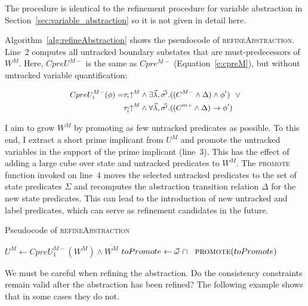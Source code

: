 The procedure is identical to the refinement procedure for variable abstraction in Section~\ref{sec:variable_abstraction} so it is not given in detail here.

Algorithm~\ref{alg:refineAbstraction} shows the pseudocode of \textsc{refineAbstraction}.  Line~2 computes all untracked boundary substates that are must-predecessors of $W^M$.  Here, $CpreU^{M-}$ is the same as $Cpre^{M-}$ (Equation~\ref{e:cpreM}), but without untracked variable quantification:

$$
    \small
\begin{aligned}
    CpreU_i^{M-}(\phi) = &\tau_i\mathord{\uparrow^M}         \land \exists \vec{\lambda},\vec{\sigma'}. ((C^{M-} \land \Delta) \land \phi')
                          ~~\lor\\
                         &\tau_{\overline{i}}\mathord{\uparrow^M} \land \forall \vec{\lambda},\vec{\sigma'}. ((C^{m+} \land \Delta) \rightarrow \phi')
\end{aligned}
$$

I aim to grow  $W^M$ by promoting as few untracked predicates as possible.  To this end, I extract a short prime implicant from $U^M$ and promote the untracked variables in the support of the prime implicant (line~3).  This has the effect of adding a large cube over state and untracked predicates to $W^M$. The \textsc{promote} function invoked on line~4 moves the selected untracked predicates to the set of state predicates $\Sigma$ and recomputes the abstraction transition relation $\Delta$ for the new state predicates.  This can lead to the introduction of new untracked and label predicates, which can serve as refinement candidates in the future.

\begin{algorithm}[t]

\caption{Pseudocode of \textsc{refineAbstraction}}
\label{alg:refineAbstraction}

\begin{algorithmic}[1]

    \State $U^M \gets CpreU_1^{M-}(W^M) \land \overline{W^M}$
    \State $toPromote \gets \vec{\omega}~\cap~$
    \State $\Call{promote}{toPromote}$
\EndFunction

\end{algorithmic}
\end{algorithm}

We must be careful when refining the abstraction. Do the consistency constraints remain valid after the abstraction has been refined? The following example shows that in some cases they do not.

